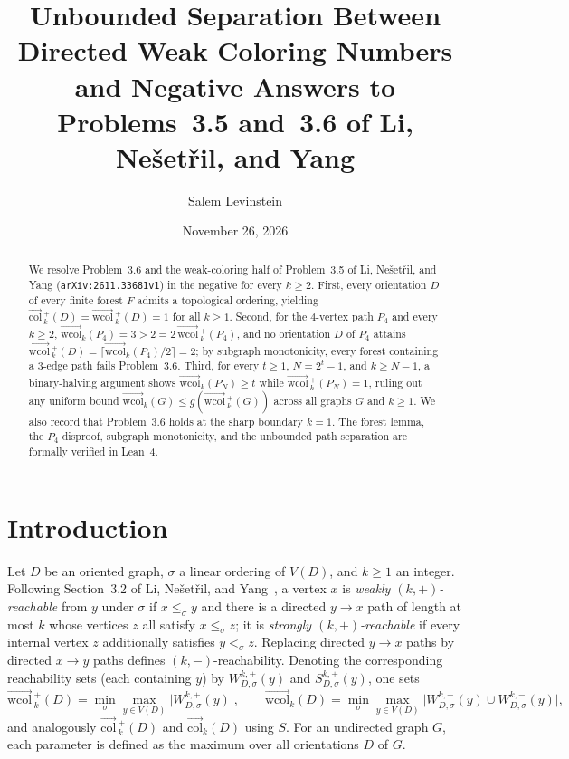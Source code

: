 \documentclass[11pt]{article}
\title{Unbounded Separation Between Directed Weak Coloring Numbers and Negative Answers to Problems~3.5 and~3.6 of Li, Ne\v{s}et\v{r}il, and Yang}
\author{Salem Levinstein}
\date{November 26, 2026}
\newcommand{\wcol}{\overrightarrow{\mathrm{wcol}}}
\newcommand{\dcol}{\overrightarrow{\mathrm{col}}}
\newcommand{\wcolp}{\overrightarrow{\mathrm{wcol}}\,^{+}}
\newcommand{\dcolp}{\overrightarrow{\mathrm{col}}\,^{+}}
\begin{document}
\maketitle

\begin{abstract}
We resolve Problem~3.6 and the weak-coloring half of Problem~3.5 of Li, Ne\v{s}et\v{r}il, and Yang (\texttt{arXiv:2611.33681v1}) in the negative for every $k \ge 2$. First, every orientation $D$ of every finite forest $F$ admits a topological ordering, yielding $\dcolp_k(D) = \wcolp_k(D) = 1$ for all $k \ge 1$. Second, for the $4$-vertex path $P_4$ and every $k \ge 2$, $\wcol_k(P_4) = 3 > 2 = 2\,\wcolp_k(P_4)$, and no orientation $D$ of $P_4$ attains $\wcolp_k(D) = \lceil \wcol_k(P_4)/2 \rceil = 2$; by subgraph monotonicity, every forest containing a $3$-edge path fails Problem~3.6. Third, for every $t \ge 1$, $N = 2^t - 1$, and $k \ge N - 1$, a binary-halving argument shows $\wcol_k(P_N) \ge t$ while $\wcolp_k(P_N) = 1$, ruling out any uniform bound $\wcol_k(G) \le g(\wcolp_k(G))$ across all graphs $G$ and $k \ge 1$. We also record that Problem~3.6 holds at the sharp boundary $k = 1$. The forest lemma, the $P_4$ disproof, subgraph monotonicity, and the unbounded path separation are formally verified in Lean~4.
\end{abstract}

\section{Introduction}

Let $D$ be an oriented graph, $\sigma$ a linear ordering of $V(D)$, and $k \ge 1$ an integer. Following Section~3.2 of Li, Ne\v{s}et\v{r}il, and Yang~\cite{LNY2026}, a vertex $x$ is \emph{weakly $(k, +)$-reachable} from $y$ under $\sigma$ if $x \le_\sigma y$ and there is a directed $y \to x$ path of length at most $k$ whose vertices $z$ all satisfy $x \le_\sigma z$; it is \emph{strongly $(k, +)$-reachable} if every internal vertex $z$ additionally satisfies $y <_\sigma z$. Replacing directed $y \to x$ paths by directed $x \to y$ paths defines $(k, -)$-reachability. Denoting the corresponding reachability sets (each containing $y$) by $W^{k, \pm}_{D, \sigma}(y)$ and $S^{k, \pm}_{D, \sigma}(y)$, one sets
\[
  \wcolp_k(D) = \min_\sigma \max_{y \in V(D)} \bigl|W^{k, +}_{D, \sigma}(y)\bigr|, \qquad
  \wcol_k(D) = \min_\sigma \max_{y \in V(D)} \bigl|W^{k, +}_{D, \sigma}(y) \cup W^{k, -}_{D, \sigma}(y)\bigr|,
\]
and analogously $\dcolp_k(D)$ and $\dcol_k(D)$ using $S$. For an undirected graph $G$, each parameter is defined as the maximum over all orientations $D$ of $G$.
\end{document}
